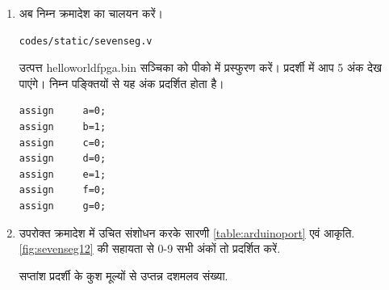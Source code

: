 \documentclass[journal,12pt,twocolumn]{IEEEtran}
\renewcommand\thesection{\arabic{section}}
\begin{document}
\begin{enumerate}[label=\thesection.\arabic*.,ref=\thesection.\theenumi]
\item अब निम्न क्रमादेश का चालयन करें।
\label{code:sevenseg}
\begin{lstlisting}
codes/static/sevenseg.v
\end{lstlisting}
उत्पत्त helloworldfpga.bin सञ्चिका  को   पीको  में प्रस्फुरण करें।  प्रदर्शी में आप 5 अंक देख पाएंगे।
निम्न पङ्क्तियों से  यह अंक  प्रदर्शित होता  है।
\begin{lstlisting}
assign     a=0;
assign     b=1;
assign     c=0;
assign     d=0;
assign     e=1;
assign     f=0;
assign     g=0;
\end{lstlisting}
\item उपरोक्त क्रमादेश में उचित संशोधन करके सारणी \ref{table:arduinoport} एवं आकृति.  \ref{fig:sevenseg12} की सहायता से 0-9 सभी अंकों तो प्रदर्शित करें.
\begin{table}[!ht]
\centering
\resizebox{\columnwidth}{!}{

}
\caption{सप्तांश प्रदर्शी के कुश मूल्यों से उप्तन्न दशमलव संख्या. }
\label{table:arduinoport}
\end{table}
\end{enumerate}
%
\end{document}
